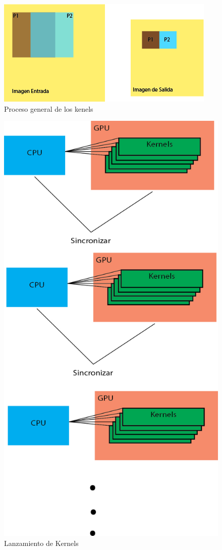 \begin{figure}[h]
			\centering
				\includegraphics[scale=1]{img/prosImg.jpg}
			\caption{Proceso general de los kenels }
\end{figure}

\begin{figure}[h]
			\centering
				\includegraphics[scale=1]{img/lanzamiento.jpg}
			\caption{Lanzamiento de Kernels }
\end{figure}
\pagebreak

